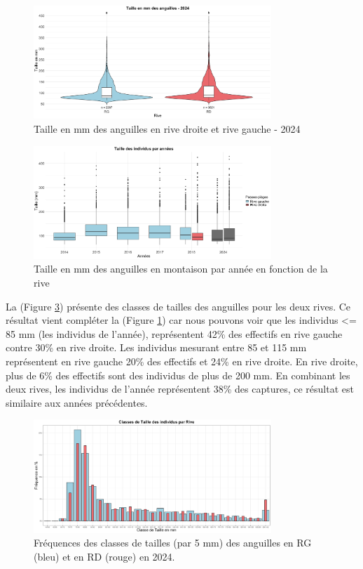 \documentclass[11pt,titlepage,twoside]{article}\usepackage[]{graphicx}\usepackage[table]{xcolor}
\begin{document}
\begin{figure}[htpb]
\centering
\includegraphics[width=0.8\textwidth]{taille_oral.png}
\caption{Taille en mm des anguilles en rive droite et rive gauche - 2024}
\label{taille_oral}
\end{figure}

\begin{figure}[htpb]
\centering
\includegraphics[width=0.8\textwidth]{taille_annee_oral.png}
\caption{Taille en mm des anguilles en montaison par année en fonction de la rive}
\label{taille_annee_oral}
\end{figure}


La (Figure \ref{classe_taille_oral}) présente des classes de tailles des anguilles pour les deux rives. Ce résultat vient compléter la (Figure \ref{taille_oral}) car nous pouvons voir que les individus <= 85 mm (les individus de l’année), représentent 42\% des effectifs en rive gauche contre 30\% en rive droite. Les individus mesurant entre 85 et 115 mm représentent en rive gauche 20\% des effectifs et 24\% en rive droite. En rive droite, plus de 6\% des effectifs sont des individus de plus de 200 mm. En combinant les deux rives, les individus de l’année représentent 38\% des captures, ce résultat est similaire aux années précédentes. 


\begin{figure}[htpb]
\centering
\includegraphics[width=0.8\textwidth]{classe_taille_oral.png}
\caption{Fréquences des classes de tailles (par 5 mm) des anguilles en RG (bleu) et en RD (rouge) en 2024.}
\label{classe_taille_oral}
\end{figure}
\end{document}
